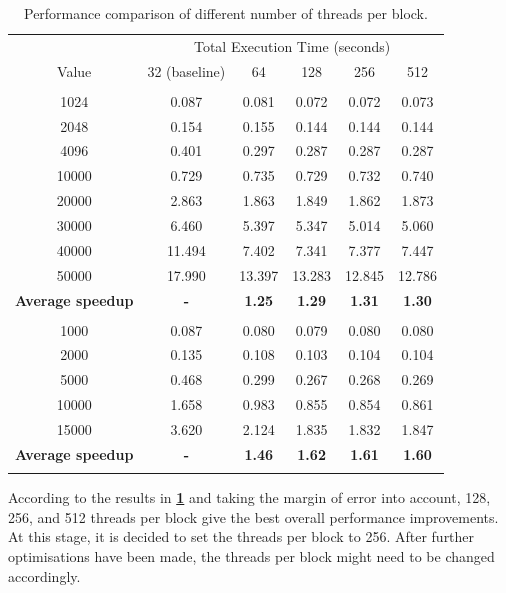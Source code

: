 \documentclass[12pt, a4paper]{article}
\let\oldcref\cref
\renewcommand{\cref}[1]{\textbf{\oldcref{#1}}}
\begin{document}
\renewcommand{\arraystretch}{1.3}
\begin{longtable}{|c|c|c|c|c|c|}
  \hline \endfirsthead & \multicolumn{5}{c|}{Total Execution Time (seconds)} \\ \cline{2-6}
  \multirow{-2}{*}{Value} & 32 (baseline) & 64 & 128 & 256 & 512 \\ \hline
  \rowcolor{lightgray}\multicolumn{6}{|c|}{\textbf{Number of Bodies (N)}} \\ \hline
  1024  & 0.087  & 0.081  & 0.072  & 0.072  & 0.073  \\
  2048  & 0.154  & 0.155  & 0.144  & 0.144  & 0.144  \\
  4096  & 0.401  & 0.297  & 0.287  & 0.287  & 0.287  \\
  10000 & 0.729  & 0.735  & 0.729  & 0.732  & 0.740  \\
  20000 & 2.863  & 1.863  & 1.849  & 1.862  & 1.873  \\
  30000 & 6.460  & 5.397  & 5.347  & 5.014  & 5.060  \\
  40000 & 11.494 & 7.402  & 7.341  & 7.377  & 7.447  \\
  50000 & 17.990 & 13.397 & 13.283 & 12.845 & 12.786 \\ \hline
  \textbf{Average speedup} & \textbf{-} & \textbf{1.25} & \textbf{1.29} & \textbf{1.31} &
  \textbf{1.30} \\ \hline
  \rowcolor{lightgray}\multicolumn{6}{|c|}{\textbf{Activity Grid Dimension (D)}} \\ \hline
  1000  & 0.087 & 0.080 & 0.079 & 0.080 & 0.080 \\
  2000  & 0.135 & 0.108 & 0.103 & 0.104 & 0.104 \\
  5000  & 0.468 & 0.299 & 0.267 & 0.268 & 0.269 \\
  10000 & 1.658 & 0.983 & 0.855 & 0.854 & 0.861 \\
  15000 & 3.620 & 2.124 & 1.835 & 1.832 & 1.847 \\ \hline
  \textbf{Average speedup} & \textbf{-} & \textbf{1.46} & \textbf{1.62} & \textbf{1.61} &
  \textbf{1.60} \\ \hline
  \caption{Performance comparison of different number of threads per block.}
  \label{table:block_size}
\end{longtable}
\renewcommand{\arraystretch}{1}

According to the results in \cref{table:block_size} and taking the margin of error into account,
128, 256, and 512 threads per block give the best overall performance improvements. At this stage,
it is decided to set the threads per block to 256. After further optimisations have been made, the
threads per block might need to be changed accordingly.
\end{document}

